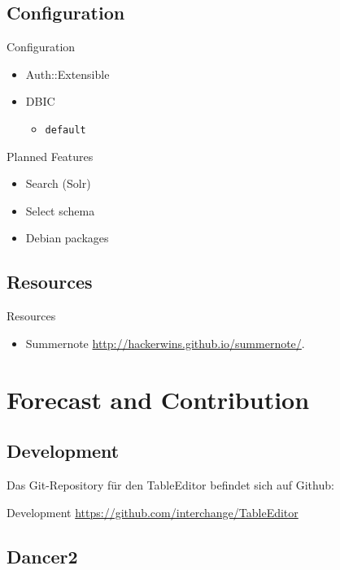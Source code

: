 \subsection{Configuration}
\begin{frame}[fragile]{Configuration}
\begin{itemize}
\item Auth::Extensible
\item DBIC
\begin{itemize}
\item \verb|default|
\end{itemize}
\end{itemize}
\end{frame}

\begin{frame}{Planned Features}
\begin{itemize}
\item Search (Solr)
\item Select schema
\item Debian packages
\end{itemize}
\end{frame}

\subsection{Resources}

\begin{frame}{Resources}
\begin{itemize}
\item Summernote \url{http://hackerwins.github.io/summernote/}.
\end{itemize}
\end{frame}{}
\section{Forecast and Contribution}

\subsection{Development}

Das Git-Repository für den TableEditor befindet sich auf Github:

\begin{frame}{Development}
\url{https://github.com/interchange/TableEditor}
\end{frame}

\subsection{Dancer2}

